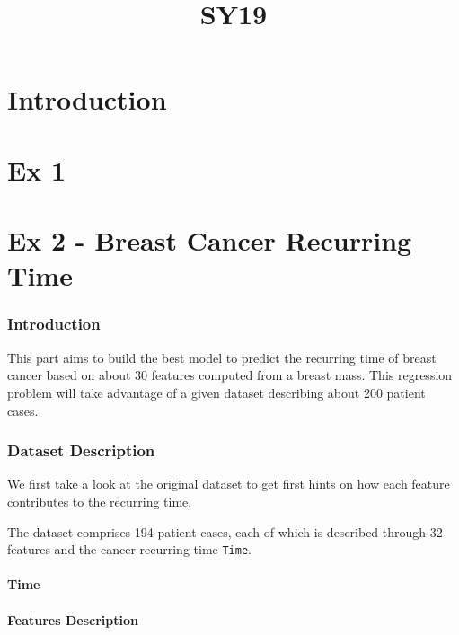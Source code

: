 \documentclass[]{report}
\title{SY19}
\author{}
\begin{document}
\maketitle

\begin{abstract}

\end{abstract}

\part{Introduction}

\part{Ex 1}

\part{Ex 2 - Breast Cancer Recurring Time}

\section{Introduction}
This part aims to build the best model to predict the recurring time of breast cancer based on about 30 features computed from a breast mass.  This regression problem will take advantage of a given dataset describing about 200 patient cases.

\section{Dataset Description}
We first take a look at the original dataset to get first hints on how each feature contributes to the recurring time.

The dataset comprises 194 patient cases, each of which is described through 32 features and the cancer recurring time \texttt{Time}.

\subsection{Time}

\subsection{Features Description}
\end{document}
